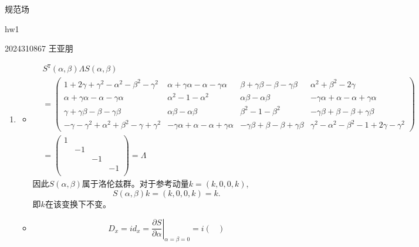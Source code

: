\documentclass{article}
\begin{document}
\begin{flushright}
    规范场
    
    hw1

    2024310867 王亚朋
\end{flushright}
\begin{enumerate}
    \item \begin{itemize}
      \item [a.]
      \begin{equation}
        \begin{aligned}
          &S^\mathtt{T}(\alpha,\beta) \Lambda S(\alpha,\beta)\\
        &=\begin{pmatrix}
          1+2\gamma+\gamma^2-\alpha^2-\beta^2-\gamma^2 & \alpha+\gamma\alpha-\alpha-\gamma\alpha & \beta+\gamma\beta-\beta-\gamma\beta & \alpha^2+\beta^2-2\gamma\\
          \alpha+\gamma\alpha-\alpha-\gamma\alpha & \alpha^2-1-\alpha^2 & \alpha\beta-\alpha\beta & -\gamma\alpha+\alpha-\alpha+\gamma\alpha \\
          \gamma+\gamma\beta-\beta-\gamma\beta & \alpha\beta-\alpha\beta & \beta^2-1-\beta^2 & -\gamma\beta+\beta-\beta+\gamma\beta\\
          -\gamma-\gamma^2+\alpha^2+\beta^2-\gamma+\gamma^2 & -\gamma\alpha+\alpha-\alpha+\gamma\alpha & -\gamma\beta+\beta-\beta+\gamma\beta & \gamma^2-\alpha^2-\beta^2-1+2\gamma-\gamma^2 
        \end{pmatrix}\\
        &=\begin{pmatrix}
          1 & & & \\
          & -1 & & \\
          & & -1 & \\
          & & & -1 \\
        \end{pmatrix}=\Lambda
        \end{aligned}
      \end{equation}
      因此$S(\alpha,\beta)$属于洛伦兹群。对于参考动量$k=(k,0,0,k)$,
      \begin{equation}
        S(\alpha,\beta)k=(k,0,0,k)=k.
      \end{equation}
      即$k$在该变换下不变。
      \item [b.]
      \begin{equation}
        D_x=id_x=\left.\frac{\partial S}{\partial \alpha}\right|_{\alpha=\beta=0}=i\begin{pmatrix}

\end{pmatrix}
\end{equation}
\end{itemize}
\end{enumerate}
\end{document}
